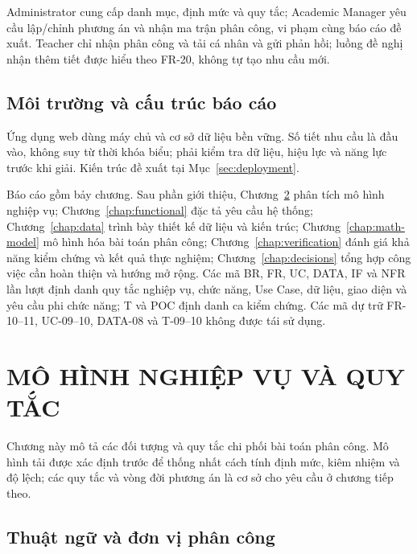\documentclass[12pt,a4paper]{report}
\newcommand{\diagramtext}[1]{\begingroup\clubpenalty=10000\widowpenalty=10000 #1\par\endgroup}
\begin{document}
\diagramtext{Administrator cung cấp danh mục, định mức và quy tắc; Academic Manager yêu cầu lập/chỉnh phương án và nhận ma trận phân công, vi phạm cùng báo cáo đề xuất. Teacher chỉ nhận phân công và tải cá nhân và gửi phản hồi; luồng đề nghị nhận thêm tiết được hiểu theo FR-20, không tự tạo nhu cầu mới.}


\section{Môi trường và cấu trúc báo cáo}\label{sec:environment}
Ứng dụng web dùng máy chủ và cơ sở dữ liệu bền vững. Số tiết nhu cầu là đầu vào, không suy từ thời khóa biểu; phải kiểm tra dữ liệu, hiệu lực và năng lực trước khi giải. Kiến trúc đề xuất tại Mục~\ref{sec:deployment}.

Báo cáo gồm bảy chương. Sau phần giới thiệu, Chương~\ref{chap:business} phân tích mô hình nghiệp vụ; Chương~\ref{chap:functional} đặc tả yêu cầu hệ thống; Chương~\ref{chap:data} trình bày thiết kế dữ liệu và kiến trúc; Chương~\ref{chap:math-model} mô hình hóa bài toán phân công; Chương~\ref{chap:verification} đánh giá khả năng kiểm chứng và kết quả thực nghiệm; Chương~\ref{chap:decisions} tổng hợp công việc cần hoàn thiện và hướng mở rộng. Các mã BR, FR, UC, DATA, IF và NFR lần lượt định danh quy tắc nghiệp vụ, chức năng, Use Case, dữ liệu, giao diện và yêu cầu phi chức năng; T và POC định danh ca kiểm chứng. Các mã dự trữ FR-10--11, UC-09--10, DATA-08 và T-09--10 không được tái sử dụng.

\chapter{MÔ HÌNH NGHIỆP VỤ VÀ QUY TẮC}\label{chap:business}
Chương này mô tả các đối tượng và quy tắc chi phối bài toán phân công. Mô hình tải được xác định trước để thống nhất cách tính định mức, kiêm nhiệm và độ lệch; các quy tắc và vòng đời phương án là cơ sở cho yêu cầu ở chương tiếp theo.


\section{Thuật ngữ và đơn vị phân công}
\end{document}
